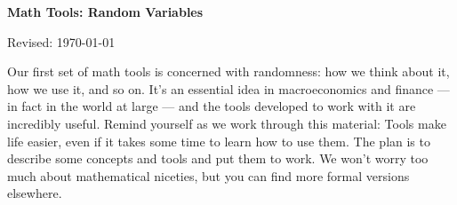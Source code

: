 %
%
%
%
%
%
%
%
%
%
%



\centerline{\Large \bf Math Tools:  Random Variables}
\centerline{Revised: \today}

\medskip
Our first set of math tools is concerned with randomness:
how we think about it, how we use it, and so on.
It's an essential idea in macroeconomics and finance ---
in fact in the world at large --- and the tools developed
to work with it are incredibly useful.
Remind yourself as we work through this material:
Tools make life easier,
even if it takes some time to learn how to use them.
The plan is to describe some concepts and tools and put them to work.
We won't worry too much about mathematical niceties, but
you can find more formal versions elsewhere.

